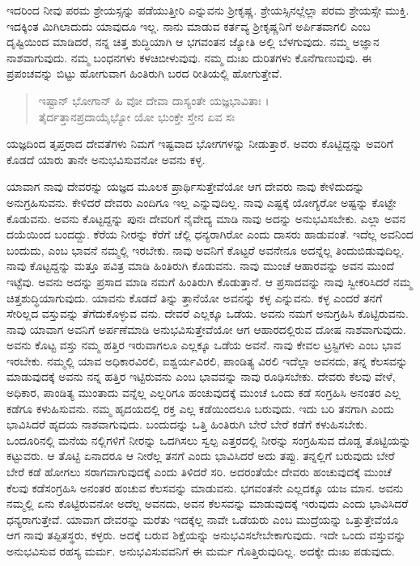ಇದರಿಂದ ನೀವು ಪರಮ ಶ್ರೇಯಸ್ಸನ್ನು ಪಡೆಯುತ್ತೀರಿ ಎನ್ನುವನು ಶ್ರೀಕೃಷ್ಣ. ಶ್ರೇಯಸ್ಸಿನಲ್ಲೆಲ್ಲಾ ಪರಮ ಶ್ರೇಯಸ್ಸೇ ಮುಕ್ತಿ. ಇದಕ್ಕಿಂತ ಮಿಗಿಲಾದುದು ಯಾವುದೂ ಇಲ್ಲ. ನಾನು ಮಾಡುವ ಕರ್ತವ್ಯ ಶ್ರೀಕೃಷ್ಣನಿಗೆ ಅರ್ಪಿತವಾಗಲಿ ಎಂಬ ದೃಷ್ಟಿಯಿಂದ ಮಾಡಿದರೆ, ನನ್ನ ಚಿತ್ತ ಶುದ್ಧಿಯಾಗಿ ಆ ಭಗವಂತನ ಜ್ಯೋತಿ ಅಲ್ಲಿ ಬೆಳಗುವುದು. ನಮ್ಮ ಅಜ್ಞಾನ ನಾಶವಾಗುವುದು. ನಮ್ಮ ಬಂಧನಗಳು ಕಳಚಿಬೀಳುವುವು. ನಮ್ಮ ದುಃಖ ದುರಿತಗಳು ಕೊನೆಗಾಣುವುವು. ಈ ಪ್ರಪಂಚವನ್ನು ಬಿಟ್ಟು ಹೋಗುವಾಗ ಹಿಂತಿರುಗಿ ಬರದ ರೀತಿಯಲ್ಲಿ ಹೋಗುತ್ತೇವೆ.

\begin{verse}
ಇಷ್ಟಾನ್ ಭೋಗಾನ್ ಹಿ ವೋ ದೇವಾ ದಾಸ್ಯಂತೇ ಯಜ್ಞಭಾವಿತಾಃ ।\\ತೈರ್ದತ್ತಾನಪ್ರದಾಯೈಭ್ಯೋ ಯೋ ಭುಂಕ್ತೇ ಸ್ತೇನ ಏವ ಸಃ 
\end{verse}

{\small ಯಜ್ಞದಿಂದ ತೃಪ್ತರಾದ ದೇವತೆಗಳು ನಿಮಗೆ ಇಷ್ಟವಾದ ಭೋಗಗಳನ್ನು ನೀಡುತ್ತಾರೆ. ಅವರು ಕೊಟ್ಟಿದ್ದನ್ನು ಅವರಿಗೆ ಕೊಡದೆ ಯಾರು ತಾನೇ ಅನುಭವಿಸುವನೋ ಅವನು ಕಳ್ಳ.}

ಯಾವಾಗ ನಾವು ದೇವರನ್ನು ಯಜ್ಞದ ಮೂಲಕ ಪ್ರಾರ್ಥಿಸುತ್ತೇವೆಯೋ ಆಗ ದೇವರು ನಾವು ಕೇಳಿದುದನ್ನು ಅನುಗ್ರಹಿಸುವನು. ಕೇಳಿದರೆ ದೇವರು ಎಂದಿಗೂ ಇಲ್ಲ ಎನ್ನುವುದಿಲ್ಲ. ನಾವು ಎಷ್ಟಕ್ಕೆ ಯೋಗ್ಯರೋ ಅಷ್ಟನ್ನು ಕೊಟ್ಟೇ ಕೊಡುವನು. ಅವನು ಕೊಟ್ಟದ್ದನ್ನು ಪುನಃ ದೇವರಿಗೆ ನೈವೇದ್ಯ ಮಾಡಿ ನಾವು ಅದನ್ನು ಅನುಭವಿಸಬೇಕು. ಎಲ್ಲಾ ಅವನ ದಯೆಯಿಂದ ಬಂದದ್ದು. ಕೆರೆಯ ನೀರನ್ನು ಕೆರೆಗೆ ಚೆಲ್ಲಿ ಧನ್ಯರಾಗಿರೋ ಎಂದು ದಾಸರು ಹಾಡುವಂತೆ. ಇದೆಲ್ಲ ಅವನಿಂದ ಬಂದುದು, ಎಂಬ ಭಾವನೆ ನಮ್ಮಲ್ಲಿ ಇರಬೇಕು. ನಾವು ಅವನಿಗೆ ಕೊಟ್ಟರೆ ಅವನೇನೂ ಅದನ್ನೆಲ್ಲ ತಿಂದುಬಿಡುವುದಿಲ್ಲ. ನಾವು ಕೊಟ್ಟದ್ದನ್ನು ಮತ್ತೂ ಪವಿತ್ರ ಮಾಡಿ ಹಿಂತಿರುಗಿ ಕೊಡುವನು. ನಾವು ಮುಂಚೆ ಆಹಾರವನ್ನು ಅವನ ಮುಂದೆ ಇಟ್ಟೆವು. ಅವನು ಅದನ್ನು ಪ್ರಸಾದ ಮಾಡಿ ನಮಗೆ ಹಿಂತಿರುಗಿ ಕೊಡುತ್ತಾನೆ. ಆ ಪ್ರಸಾದವನ್ನು ನಾವು ಸ್ವೀಕರಿಸಿದರೆ ನಮ್ಮ ಚಿತ್ತಶುದ್ಧಿಯಾಗುವುದು. ಯಾವನು ಕೊಡದೆ ತಿನ್ನು ತ್ತಾನೆಯೋ ಅವನನ್ನು ಕಳ್ಳ ಎನ್ನುವನು. ಕಳ್ಳ ಎಂದರೆ ತನಗೆ ಸೇರಿಲ್ಲದ ವಸ್ತುವನ್ನು ತೆಗೆದುಕೊಳ್ಳುವ ವನು. ದೇವರೆ ಎಲ್ಲಕ್ಕೂ ಒಡೆಯ. ಅವನು ನಮಗೆ ಅನುಗ್ರಹಿಸಿ ಕೊಟ್ಟಿರುವನು. ನಾವು ಯಾವಾಗ ಅವನಿಗೆ ಅರ್ಪಣೆಮಾಡಿ ಅನುಭವಿಸುತ್ತೇವೆಯೋ ಆಗ ಆಹಾರದಲ್ಲಿರುವ ದೋಷ ನಾಶವಾಗುವುದು. ಅವನು ಕೊಟ್ಟ ವಸ್ತು ನಮ್ಮ ಹತ್ತಿರ ಇರುವಾಗಲೂ ಎಲ್ಲಕ್ಕೂ ಒಡೆಯ ಅವನೆ. ನಾವು ಕೇವಲ ಟ್ರಸ್ಟಿಗಳು ಎಂಬ ಭಾವ ಇರಬೇಕು. ನಮ್ಮಲ್ಲಿ ಯಾವ ಅಧಿಕಾರವಿರಲಿ, ಐಶ್ವರ್ಯವಿರಲಿ, ಪಾಂಡಿತ್ಯ ವಿರಲಿ ಇದೆಲ್ಲಾ ಅವನದು, ತನ್ನ ಕೆಲಸವನ್ನು ಮಾಡುವುದಕ್ಕೆ ಅವನು ನನ್ನ ಹತ್ತಿರ ಇಟ್ಟಿರುವನು ಎಂಬ ಭಾವವನ್ನು ನಾವು ರೂಢಿಸಬೇಕು. ದೇವರು ಕೆಲವು ವೇಳೆ, ಅಧಿಕಾರ, ಪಾಂಡಿತ್ಯ ಮುಂತಾದು ವನ್ನೆಲ್ಲ ಎಲ್ಲರಿಗೂ ಹಂಚುವುದಕ್ಕೆ ಮುಂಚೆ ಒಂದು ಕಡೆ ಸಂಗ್ರಹಿಸಿ ಅನಂತರ ಎಲ್ಲ ಕಡೆಗೂ ಕಳುಹಿಸುವನು. ನಮ್ಮ ಹೃದಯದಲ್ಲಿ ರಕ್ತ ಎಲ್ಲ ಕಡೆಯಿಂದಲೂ ಬರುವುದು. ಇದು ಬರಿ ತನಗಾಗಿ ಎಂದು ಭಾವಿಸಿದರೆ ಹೃದಯ ನಾಶವಾಗುವುದು. ಬಂದುದನ್ನು ಒತ್ತಿ ಹಿಂತಿರುಗಿ ಬೇರೆ ಬೇರೆ ಕಡೆಗೆ ಕಳುಹಿಸಬೇಕು. ಒಂದೂರಿನಲ್ಲಿ ಮನೆಯ ನಲ್ಲಿಗಳಿಗೆ ನೀರನ್ನು ಒದಗಿಸಲು ಸ್ವಲ್ಪ ಎತ್ತರದಲ್ಲಿ ನೀರನ್ನು ಸಂಗ್ರಹಿಸುವ ದೊಡ್ಡ ತೊಟ್ಟಿಯನ್ನು ಕಟ್ಟುವರು. ಆ ತೊಟ್ಟಿ ಏನಾದರೂ ಆ ನೀರೆಲ್ಲ ತನಗೆ ಎಂದು ಭಾವಿಸಿದರೆ ಅದು ತಪ್ಪು. ತನ್ನಲ್ಲಿಗೆ ಬರುವುದು ಬೇರೆ ಬೇರೆ ಕಡೆ ಹೋಗಲು ಸರಾಗವಾಗುವುದಕ್ಕೆ ಎಂದು ತಿಳಿದರೆ ಸರಿ. ಅದರಂತೆಯೇ ದೇವರು ಹಂಚುವುದಕ್ಕೆ ಮುಂಚೆ ಕೆಲವು ಕಡೆಸಂಗ್ರಹಿಸಿ ಅನಂತರ ಹಂಚುವ ಕೆಲಸವನ್ನು ಮಾಡುವನು. ಭಗವಂತನೇ ಎಲ್ಲದಕ್ಕೂ ಯಜ ಮಾನ. ಅವನು ನಮ್ಮಲ್ಲಿ ಏನು ಕೊಟ್ಟಿರುವನೋ ಅದೆಲ್ಲ ಅವನದು, ಅವನ ಕೆಲಸವನ್ನು ಮಾಡುವುದಕ್ಕೆ ಇರುವುದು ಎಂದು ಭಾವಿಸಿದರೆ ಧನ್ಯರಾಗುತ್ತೇವೆ. ಯಾವಾಗ ದೇವರನ್ನು ಮರೆತು ಇದಕ್ಕೆಲ್ಲ ನಾವೇ ಒಡೆಯರು ಎಂಬ ಮುದ್ರೆಯನ್ನು ಒತ್ತುತ್ತೇವೆಯೊ ಆಗ ನಾವು ತಪ್ಪಿತಸ್ಥರು, ಕಳ್ಳರು. ಅದಕ್ಕೆ ಬರುವ ಶಿಕ್ಷೆಯನ್ನು ಅನುಭವಿಸಲೇಬೇಕಾಗುವುದು. ಇದೇ ಒಂದು ವಸ್ತುವನ್ನು ಅನುಭವಿಸುವ ರಹಸ್ಯ ಮರ್ಮ. ಅನುಭವಿಸುವವನಿಗೆ ಈ ಮರ್ಮ ಗೊತ್ತಿರುವುದಿಲ್ಲ. ಅದಕ್ಕೇ ದುಃಖ ಪಡುವುದು.

